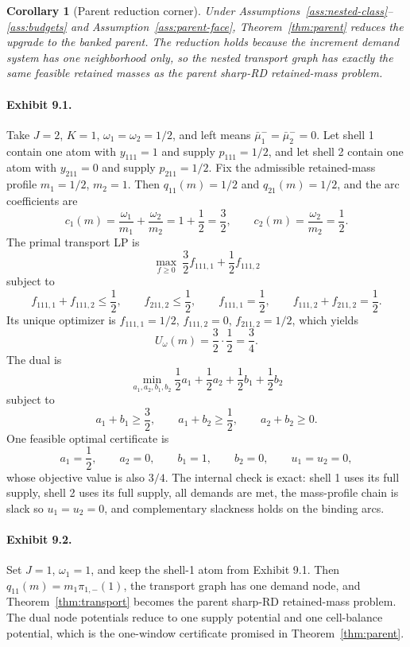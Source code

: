 \documentclass[11pt]{article}
\theoremstyle{definition}
\theoremstyle{plain}
\newtheorem{corollary}{Corollary}
\theoremstyle{remark}
\begin{document}
\begin{corollary}[Parent reduction corner]\label{cor:parent}
Under Assumptions~\ref{ass:nested-class}--\ref{ass:budgets} and Assumption~\ref{ass:parent-face},
Theorem~\ref{thm:parent} reduces the upgrade to the banked parent.  The reduction holds because the
increment demand system has one neighborhood only, so the nested transport graph has exactly the same
feasible retained masses as the parent sharp-RD retained-mass problem.
\end{corollary}

\paragraph{Exhibit 9.1.}
Take \(J=2\), \(K=1\), \(\omega_1=\omega_2=1/2\), and left means \(\bar\mu^-_1=\bar\mu^-_2=0\).  Let shell 1
contain one atom with \(y_{111}=1\) and supply \(p_{111}=1/2\), and let shell 2 contain one atom with
\(y_{211}=0\) and supply \(p_{211}=1/2\).  Fix the admissible retained-mass profile \(m_1=1/2\), \(m_2=1\).
Then \(q_{11}(m)=1/2\) and \(q_{21}(m)=1/2\), and the arc coefficients are
\[
  c_1(m)=\frac{\omega_1}{m_1}+\frac{\omega_2}{m_2}=1+\frac12=\frac32,
  \qquad
  c_2(m)=\frac{\omega_2}{m_2}=\frac12.
\]
The primal transport LP is
\[
  \max_{f\ge0}\ \frac32 f_{111,1}+\frac12 f_{111,2}
\]
subject to
\[
  f_{111,1}+f_{111,2}\le \frac12,\qquad
  f_{211,2}\le\frac12,\qquad
  f_{111,1}=\frac12,\qquad
  f_{111,2}+f_{211,2}=\frac12.
\]
Its unique optimizer is \(f_{111,1}=1/2\), \(f_{111,2}=0\), \(f_{211,2}=1/2\), which yields
\[
  U_\omega(m)=\frac32\cdot\frac12=\frac34.
\]
The dual is
\[
  \min_{a_1,a_2,b_1,b_2}
  \frac12 a_1+\frac12 a_2+\frac12 b_1+\frac12 b_2
\]
subject to
\[
  a_1+b_1\ge\frac32,\qquad
  a_1+b_2\ge\frac12,\qquad
  a_2+b_2\ge 0.
\]
One feasible optimal certificate is
\[
  a_1=\frac12,\qquad a_2=0,\qquad b_1=1,\qquad b_2=0,\qquad u_1=u_2=0,
\]
whose objective value is also \(3/4\).  The internal check is exact: shell 1 uses its full supply, shell 2
uses its full supply, all demands are met, the mass-profile chain is slack so \(u_1=u_2=0\), and
complementary slackness holds on the binding arcs.

\paragraph{Exhibit 9.2.}
Set \(J=1\), \(\omega_1=1\), and keep the shell-1 atom from Exhibit 9.1.  Then \(q_{11}(m)=m_1\pi_{1,-}(1)\),
the transport graph has one demand node, and Theorem~\ref{thm:transport} becomes the parent sharp-RD
retained-mass problem.  The dual node potentials reduce to one supply potential and one cell-balance
potential, which is the one-window certificate promised in Theorem~\ref{thm:parent}.
\end{document}
